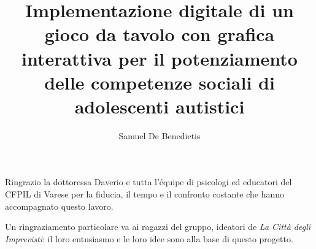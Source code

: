 \documentclass[12pt]{report}
\title{Implementazione digitale di un gioco da tavolo con grafica interattiva per il potenziamento delle competenze sociali di adolescenti autistici}
\author{Samuel De Benedictis}
\begin{document}
\makefrontpage

% 
%

	
	
	
	
  
	
	
	

\clearpage
\beforepreface

% 
%


%
%

Ringrazio la dottoressa Daverio e tutta l'équipe di psicologi ed educatori del CFPIL di Varese per la fiducia, il tempo e il confronto costante che hanno accompagnato questo lavoro.

Un ringraziamento particolare va ai ragazzi del gruppo, ideatori de \textit{La Città degli Imprevisti}: il loro entusiasmo e le loro idee sono alla base di questo progetto.

%
%

\afterpreface

% 
% 
\end{document}
